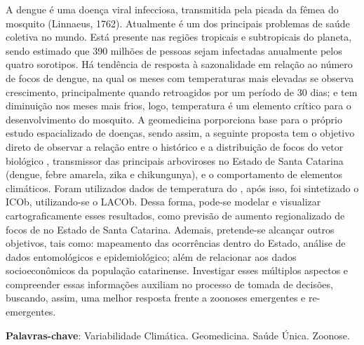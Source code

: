 \setlength{\absparsep}{18pt} %
\renewcommand{\baselinestretch}{1} 
\begin{resumo}
A dengue é uma doença viral infecciosa, transmitida pela picada da fêmea do mosquito  (Linnaeus, 1762). Atualmente é um dos principais problemas de saúde coletiva no mundo. Está presente nas regiões tropicais e subtropicais do planeta, sendo estimado que 390 milhões de pessoas sejam infectadas anualmente pelos quatro sorotipos. Há tendência de resposta à sazonalidade em relação ao número de focos de dengue, na qual os meses com temperaturas mais elevadas se observa crescimento, principalmente quando retroagidos por um período de 30 dias; e tem diminuição nos meses mais frios, logo, temperatura é um elemento crítico para o desenvolvimento do mosquito. A geomedicina porporciona base para o próprio estudo espacializado de doenças, sendo assim, a seguinte proposta tem o objetivo direto de observar a relação entre o histórico e a distribuição de focos do vetor biológico , transmissor das principais arboviroses no Estado de Santa Catarina (dengue, febre amarela, zika e chikungunya), e o comportamento de elementos climáticos. Foram utilizados dados de temperatura do , após isso, foi sintetizado o \acrfull{ICOb}, utilizando-se o \acrfull{LACOb}. Dessa forma, pode-se modelar e visualizar cartograficamente esses resultados, como previsão de aumento regionalizado de focos de  no Estado de Santa Catarina. Ademais, pretende-se alcançar outros objetivos, tais como: mapeamento das ocorrências dentro do Estado, análise de dados entomológicos e epidemiológico; além de relacionar aos dados socioeconômicos da população catarinense. Investigar esses múltiplos aspectos e compreender essas informações auxiliam no processo de tomada de decisões, buscando, assim, uma melhor resposta frente a zoonoses emergentes e re-emergentes.
 
   \noindent 
    \textbf{Palavras-chave}: Variabilidade Climática. Geomedicina. Saúde Única. Zoonose. 
\end{resumo}

